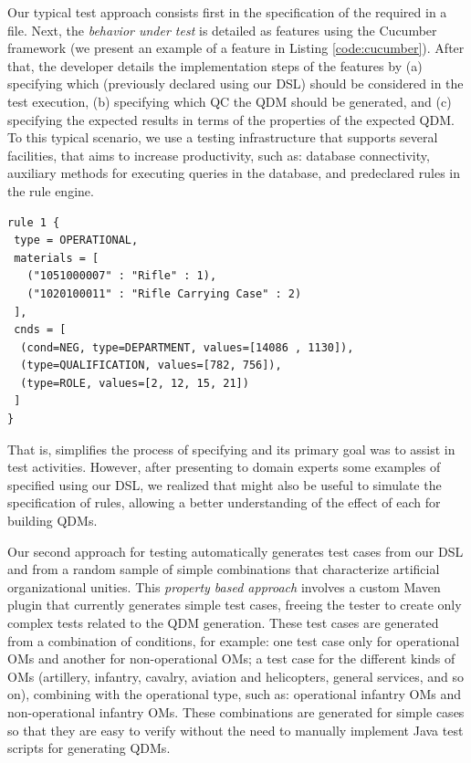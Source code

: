 Our typical test approach consists first in the specification of the required \callers in a \hlrdsl
file. Next, the \emph{behavior under test} is detailed as features using
the Cucumber~\cite{wynne2017cucumber} framework (we present an 
example of a feature in Listing \ref{code:cucumber}). After that, the developer details 
the implementation steps of the features by (a) specifying which \callers
(previously declared using our DSL) should be considered 
in the test execution, (b) specifying which QC the QDM should be generated,
and (c) specifying the expected results in terms of the properties of the expected QDM. 
To this typical scenario, we use a testing  infrastructure that supports several facilities,
that aims to increase productivity, such as: database connectivity,
auxiliary methods for executing queries in the database, and predeclared rules in the rule engine.

\begin{small}
\begin{lstlisting}[frame=single, language=DSL, caption={\it Example of a \shc declaration using our DSL}, label={code:dslExample}]
rule 1 { 
 type = OPERATIONAL, 
 materials = [ 
   ("1051000007" : "Rifle" : 1), 
   ("1020100011" : "Rifle Carrying Case" : 2)
 ], 
 cnds = [ 
  (cond=NEG, type=DEPARTMENT, values=[14086 , 1130]),
  (type=QUALIFICATION, values=[782, 756]), 
  (type=ROLE, values=[2, 12, 15, 21])
 ]
}
\end{lstlisting}
\end{small}


That is, \hlrdsl simplifies the process of specifying \callers and its primary goal was to 
assist in test activities. However, after presenting to domain experts some examples of \callers specified using 
our DSL, we realized that \hlrdsl might also be useful  
to simulate the specification of rules, allowing a better understanding of the effect of each 
\shc for building QDMs.




Our second approach for testing automatically generates test cases 
from our DSL and from a random sample of simple combinations that
characterize artificial organizational unities. This \emph{property
based approach} involves a custom Maven plugin that currently generates simple test cases, 
freeing the tester to create only complex tests related to the QDM generation. 
These test cases are generated from a combination of conditions, for example:
one test case only for operational OMs 
and another for non-operational OMs; a test case for the different kinds of OMs (artillery, infantry,
cavalry, aviation and helicopters, general services, and so on), combining with the operational type, 
such as: operational infantry OMs and non-operational infantry OMs. These combinations are generated for simple 
cases so that they are easy to verify without the need to manually implement
Java test scripts for generating QDMs. 

